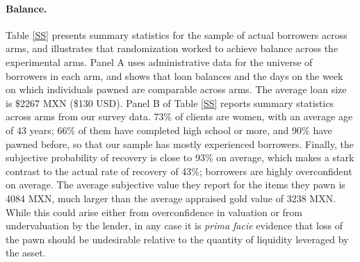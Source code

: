 \documentclass[oneside,11pt]{article}
\begin{document}
   

    
\paragraph{Balance.} Table \ref{SS} presents summary statistics for the sample of actual borrowers across arms, and illustrates that randomization worked to achieve balance across the experimental arms. Panel A uses administrative data for the universe of borrowers in each arm, and shows that loan balances and the days on the week on which individuals pawned are comparable across arms. The average loan size is \$2267 MXN (\$130 USD). Panel B of Table \ref{SS} reports summary statistics across arms from our survey data. 73\% of clients are women, with an average age of 43 years; 66\% of them have completed high school or more, and 90\% have pawned before, so that our sample has mostly experienced borrowers. Finally, the subjective probability of recovery is close to 93\% on average, which makes a stark contrast to the actual rate of recovery of 43\%; borrowers are highly overconfident on average. The average subjective value they report for the items they pawn is 4084 MXN, much larger than the average appraised gold value of 3238 MXN. While this could arise either from overconfidence in valuation or from undervaluation by the lender, in any case it is \textit{prima facie} evidence that loss of the pawn should be undesirable relative to the quantity of liquidity leveraged by the asset. 
\end{document}
